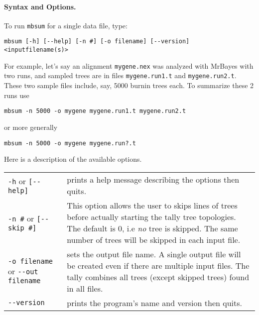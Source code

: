 \documentclass[12pt,english,final,letterpaper]{article}
\newcommand{\com}[1]{}
\begin{document}
\paragraph{Syntax and Options.}
To run {\tt mbsum} for a single data file, type:
\begin{verbatim}
mbsum [-h] [--help] [-n #] [-o filename] [--version] <inputfilename(s)> 
\end{verbatim}
For example, let's say an alignment \texttt{mygene.nex} was 
analyzed with MrBayes with two runs, and sampled trees are in files
\texttt{mygene.run1.t} and \texttt{mygene.run2.t}. These two
sample files include, say, 5000 burnin trees each. To summarize 
these 2 runs  use
\begin{verbatim}
mbsum -n 5000 -o mygene mygene.run1.t mygene.run2.t
\end{verbatim}
or more generally
\begin{verbatim}
mbsum -n 5000 -o mygene mygene.run?.t
\end{verbatim}
\com{
 Note: the older version of \texttt{mbsum} could only take a single
 file. It was then necessary to have a single file for each locus, 
 and to combine all independent MrBayes runs from the same locus
 into a single file. This is no longer necessary. 
 With version 1.02b of \texttt{mbsum}, there can be several 
 input files, such as several parallel runs from MrBayes.
}
Here is a description of the available options.
\begin{center}
\begin{tabular}{p{1.59in}|p{4.7in}}
{\tt -h} or \verb+[--help]+& prints a help message describing the options
then quits.\\
{\tt -n \#} or \verb+[--skip #]+& This option allows the user to 
skips lines of trees before actually starting the tally tree 
topologies. The default is 0, i.e {\em no} tree is skipped. 
The same number of trees will be skipped in each input file.\\
{\tt -o filename} or \verb+--out filename+& sets the output file name. A single output
file will be created even if there are multiple input files.
The tally combines all trees (except skipped trees) found in all 
files. \\
\verb+--version+& prints the program's name and version then quits.
\end{tabular}\end{center}
\com{ fixit:
 Since {\tt mbsum} needs to be run on all tree files {\tt *.t}, we provide
 here a way to do so very efficiently. 
 \begin{verbatim}
 for X in *.t; do mbsum -n 1000 $X; done
 \end{verbatim} %
}
\end{document}

